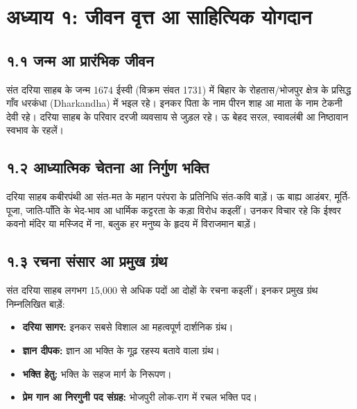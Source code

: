
\cleardoublepage
\section*{अध्याय १: जीवन वृत्त आ साहित्यिक योगदान}

\subsection*{१.१ जन्म आ प्रारंभिक जीवन}

संत दरिया साहब के जन्म 1674 ईस्वी (विक्रम संवत 1731) में बिहार के रोहतास/भोजपुर क्षेत्र के प्रसिद्ध गाँव धरकंधा {\engfont (Dharkandha)} में भइल रहे। इनकर पिता के नाम पीरन शाह आ माता के नाम टेकनी देवी रहे। दरिया साहब के परिवार दरजी व्यवसाय से जुड़ल रहे। ऊ बेहद सरल, स्वावलंबी आ निष्ठावान स्वभाव के रहलें।

\subsection*{१.२ आध्यात्मिक चेतना आ निर्गुण भक्ति}

दरिया साहब कबीरपंथी आ संत-मत के महान परंपरा के प्रतिनिधि संत-कवि बाड़ें। ऊ बाह्य आडंबर, मूर्ति-पूजा, जाति-पाँति के भेद-भाव आ धार्मिक कट्टरता के कड़ा विरोध कइलीं। उनकर विचार रहे कि ईश्वर कवनो मंदिर या मस्जिद में ना, बलुक हर मनुष्य के हृदय में विराजमान बाड़ें।

\subsection*{१.३ रचना संसार आ प्रमुख ग्रंथ}

संत दरिया साहब लगभग 15,000 से अधिक पदों आ दोहों के रचना कइलीं। इनकर प्रमुख ग्रंथ निम्नलिखित बाड़ें:

\begin{itemize}
  \item \textbf{दरिया सागर:} इनकर सबसे विशाल आ महत्वपूर्ण दार्शनिक ग्रंथ।
  \item \textbf{ज्ञान दीपक:} ज्ञान आ भक्ति के गूढ़ रहस्य बतावे वाला ग्रंथ।
  \item \textbf{भक्ति हेतु:} भक्ति के सहज मार्ग के निरूपण।
  \item \textbf{प्रेम गान आ निरगुनी पद संग्रह:} भोजपुरी लोक-राग में रचल भक्ति पद।
\end{itemize}

